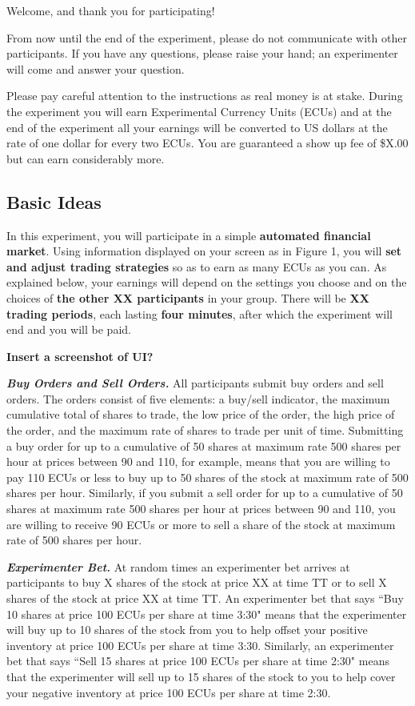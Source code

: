 \documentclass{article}
\begin{document}
Welcome, and thank you for participating!

\noindent
From now until the end of the experiment, please do not communicate with other participants. If you have any questions, please raise your hand; an experimenter will come and answer your question.

\noindent
Please pay careful attention to the instructions as real money is at stake.
During the experiment you will earn Experimental Currency Units (ECUs) and at the end of the experiment all your earnings will be converted to US dollars at the rate of one dollar for every two ECUs. You are guaranteed a show up fee of \$X.00 but can earn considerably more. 

\subsection*{Basic Ideas} 
In this experiment, you will participate in a simple \textbf{automated financial market}. Using information displayed on your screen as in Figure 1, you will \textbf{set and adjust trading strategies} so as to earn as many ECUs as you can. As explained below, your earnings will depend on the settings you choose and on the choices of \textbf{the other XX participants} in your group. There will be \textbf{XX trading periods}, each lasting \textbf{four minutes}, after which the experiment will end and you will be paid. 

\textbf{\large Insert a screenshot of UI?  }

\noindent
\textit{\textbf{Buy Orders and Sell Orders.}} All participants submit buy
orders and sell orders. The orders consist of five elements: a buy/sell indicator, the maximum cumulative total of shares to trade, the low price of the order, the high price of the order, and the maximum rate of shares to trade per unit of time. Submitting a buy order for up to a cumulative of 50 shares at maximum rate 500 shares per hour at prices between 90 and 110, for example, means that you are willing to pay 110 ECUs or less to buy up to 50 shares of the stock at maximum rate of 500 shares per hour.
Similarly, if you submit a sell order for up to a cumulative of 50 shares at maximum rate 500 shares per hour at prices between 90 and 110, you are willing to receive 90 ECUs or more to sell a share of the stock at maximum rate of 500 shares per hour.

\noindent
\textit{\textbf{Experimenter Bet.}} At random times an experimenter bet arrives at participants to buy X shares of the stock at price XX at time TT or to sell X shares of the stock at price XX at time TT. An experimenter bet that says ``Buy 10 shares at price 100 ECUs per share at time 3:30" means that the experimenter will buy up to 10 shares of the stock from you to help offset your positive inventory at price 100 ECUs per share at time 3:30. Similarly, an experimenter bet that says ``Sell 15 shares at price 100 ECUs per share at time 2:30" means that the experimenter will sell up to 15 shares of the stock to you to help cover your negative inventory at price 100 ECUs per share at time 2:30.
\end{document}
